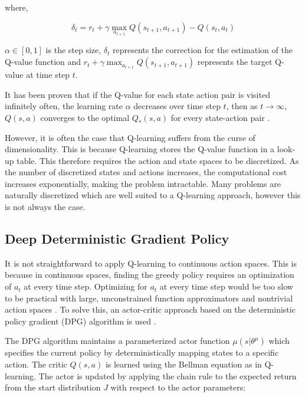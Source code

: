 \documentclass[conference]{IEEEtran}
\begin{document}
\noindent where,

\begin{equation}
	\delta_t=r_t+\gamma\max_{a_{t+1}}Q(s_{t+1},a_{t+1})-Q(s_{t},a_t)
\end{equation}

\noindent $\alpha\in [0,1]$ is the step size, $\delta_t$ represents the correction for the estimation of the Q-value function and $r_t+\gamma\max_{a_{t+1}}Q(s_{t+1},a_{t+1})$ represents the target Q-value at time step $t$.	


It has been proven that if the Q-value for each state action pair is visited infinitely often, the learning rate $\alpha$ decreases over time step $t$, then as $t\rightarrow \infty$, $Q(s,a)$ converges to the optimal $Q_*(s,a)$ for every state-action pair \cite{Gay2007}.

However, it is often the case that Q-learning suffers from the curse of dimensionality. This is because Q-learning stores the Q-value function in a look-up table. This therefore requires the action and state spaces to be discretized. As the number of discretized states and actions increases, the computational cost increases exponentially, making the problem intractable. Many problems are naturally discretized which are well suited to a Q-learning approach, however this is not always the case. 

\subsection{Deep Deterministic Gradient Policy}


It is not straightforward to apply Q-learning to continuous action spaces. This is because in continuous spaces, finding the greedy policy requires an optimization of $a_t$ at every time step. Optimizing for $a_t$ at every time step would be too slow to be practical with large, unconstrained function approximators and nontrivial action spaces \cite{hunt2016a}. To solve this, an actor-critic approach based on the deterministic policy gradient (DPG) algorithm is used \cite{Silver2014}.


The DPG algorithm maintains a parameterized actor function $\mu(s|\theta^\mu)$ which specifies the current policy by deterministically mapping states to a specific action. The critic $Q(s,a)$ is learned using the Bellman equation as in Q-learning. The actor is updated by applying the chain rule to the expected return from the start distribution $J$ with respect to the actor parameters:
\end{document}
